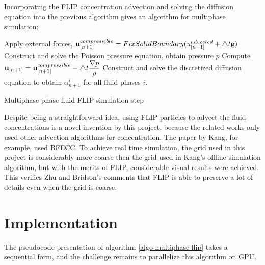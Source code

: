 Incorporating the FLIP concentration advection and solving the diffusion equation into the previous algorithm gives an algorithm for multiphase simulation:

\begin{algorithm}[H]
    \label{algo multiphase flip}

    \SetAlgoLined
    Apply external forces, $\textbf{u}_{[n+1]}^{compressible} =  FixSolidBoundary(u_{[n+1]}^{advected} + \triangle t \textbf{g})$\;
    Construct and solve the Poisson pressure equation, obtain pressure $p$\;
    Compute $\textbf{u}_{[n+1]} = \textbf{u}_{[n+1]}^{compressible} - \triangle t \dfrac{\nabla p}{\rho}$\;
    Construct and solve the discretized diffusion equation to obtain $\alpha^i_{n+1}$ for all fluid phases $i$.

    \caption{Multiphase phase fluid FLIP simulation step}
\end{algorithm}



Despite being a straightforward idea, using FLIP particles to advect the fluid concentrations is a novel invention by this project, because the related works only used other advection algorithms for concentration. The paper by Kang\cite{kang2010hybrid}, for example, used BFECC. To achieve real time simulation, the grid used in this project is considerably more coarse then the grid used in Kang's offline simulation algorithm, but with the merits of FLIP, considerable visual results were achieved. This verifies Zhu and Bridson's comments that FLIP is able to preserve a lot of details even when the grid is coarse\cite{zhu2005animating}.


\section{Implementation}

The pseudocode presentation of algorithm \ref{algo multiphase flip} takes a sequential form, and the challenge remains to parallelize this algorithm on GPU. 

